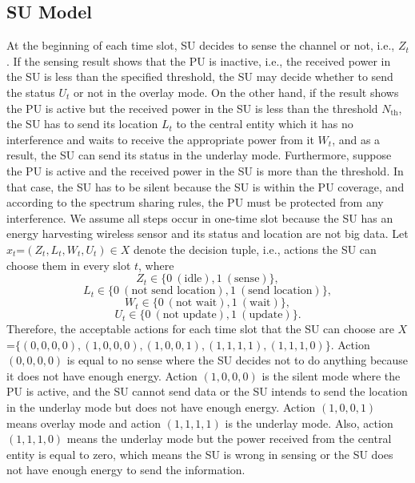 \documentclass[journal]{IEEEtran}
\begin{document}
	\subsection{SU Model}
		At the beginning of each time slot, SU decides to sense the channel or not, i.e., $Z_t$. If the sensing result shows that the PU is inactive, i.e., the received power in the SU is less than the specified threshold, the SU may decide whether to send the status $U_t$ or not in the overlay mode. On the other hand, if the result shows the PU is active but the received power in the SU is less than the threshold $N_{\text{th}}$, the SU has to send its location $L_t$ to the central entity which it has no interference and waits to receive the appropriate power from it $W_t$, and as a result, the SU can send its status in the underlay mode. Furthermore, suppose the PU is active and the received power in the SU is more than the threshold. In that case, the SU has to be silent because the SU is within the PU coverage, and according to the spectrum sharing rules, the PU must be protected from any interference. We assume all steps occur in one-time slot because the SU has an energy harvesting wireless sensor and its status and location are not big data.
		Let $x_t$=$(Z_t,L_t,W_t,U_t) \in X$ denote the decision tuple, i.e., actions the SU can choose them in every slot $t$, where
		\begin{displaymath}
			Z_t\in\{0~(\text{idle}),1~(\text{sense})\},
		\end{displaymath}  
		\begin{displaymath}
			L_t\in\{0~(\text{not~send~location}),1~(\text{send~location})\},
		\end{displaymath} 
		\begin{displaymath}
			W_t\in\{0~(\text{not~wait}),1~(\text{wait})\},
		\end{displaymath} 
		\begin{displaymath}
			U_t\in\{0~(\text{not~update}),1~(\text{update})\}.
		\end{displaymath}                       
		Therefore, the acceptable actions for each time slot that the SU can choose are $X$=$\{(0,0,0,0),(1,0,0,0),(1,0,0,1),(1,1,1,1),(1,1,1,0)\}$. Action $(0,0,0,0)$ is equal to no sense where the SU decides not to do anything because it does not have enough energy. Action $(1,0,0,0)$ is the silent mode where the PU is active, and the SU cannot send data or the SU intends to send the location in the underlay mode but does not have enough energy. Action $(1,0,0,1)$ means overlay mode and action $(1,1,1,1)$ is the underlay mode. Also, action $(1,1,1,0)$ means the underlay mode but the power received from the central entity is equal to zero, which means the SU is wrong in sensing or the SU does not have enough energy to send the information.
		
\end{document}

